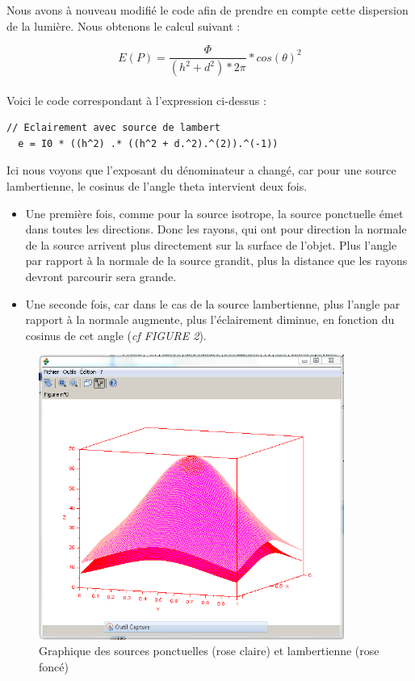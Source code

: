 \documentclass[a4paper,11pt]{article}
\begin{document}
  Nous avons à nouveau modifié le code afin de prendre en compte cette dispersion de la 
  lumière. Nous obtenons le calcul suivant :
  
  $$ E(P)=\frac{\Phi}{(h^{2}+d^{2})*2\pi}*cos(\theta)^{2} $$\\
  
  Voici le code correspondant à l'expression ci-dessus :
  
  \begin{lstlisting}[caption=Nouvelle eclairement pour une source lambertienne]
  // Eclairement avec source de lambert
  e = I0 * ((h^2) .* ((h^2 + d.^2).^(2)).^(-1))
  \end{lstlisting}
  
  Ici nous voyons que l'exposant du dénominateur a changé, car pour une source lambertienne, 
  le cosinus de l'angle theta intervient deux fois.
  \begin{itemize}
    \item Une première fois, comme pour la source isotrope, la source ponctuelle émet dans toutes 
    les directions. Donc les rayons, qui ont pour direction la normale de la source arrivent plus 
    directement sur la surface de l'objet. Plus l'angle par rapport à la normale de la source grandit, 
    plus la distance que les rayons devront parcourir sera grande.
    \item Une seconde fois, car dans le cas de la source lambertienne, plus l'angle par rapport 
    à la normale augmente, plus l'éclairement diminue, en fonction du cosinus de cet angle 
    (\textit{cf FIGURE 2}).\\
  \end{itemize}
  
  \begin{figure}[H]
    \center
    \includegraphics[width=10cm]{../iso_lamb.PNG}
    \caption{Graphique des sources ponctuelles (rose claire) et lambertienne (rose foncé)}
  \end{figure}
  
\end{document}
